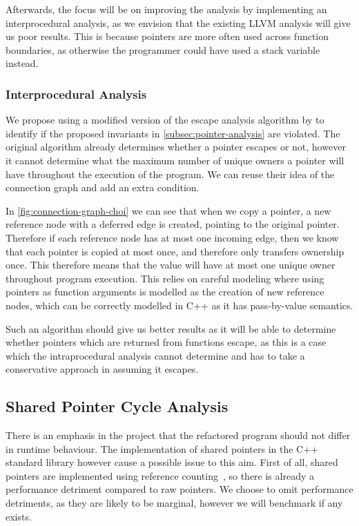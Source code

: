 \documentclass{proposal}
\begin{document}
    Afterwards, the focus will be on improving the analysis by implementing an interprocedural analysis, as we envision that the existing LLVM analysis will give us poor results.
    This is because pointers are more often used across function boundaries, as otherwise the programmer could have used a stack variable instead.

    \subsubsection{Interprocedural Analysis}\label{subsubsec:interprocedural-analysis}

    We propose using a modified version of the escape analysis algorithm by \citet{Choi1999} to identify if the proposed invariants in \autoref{subsec:pointer-analysis} are violated.
    The original algorithm already determines whether a pointer escapes or not, however it cannot determine what the maximum number of unique owners a pointer will have throughout the execution of the program.
    We can reuse their idea of the connection graph and add an extra condition.

    In \autoref{fig:connection-graph-choi} we can see that when we copy a pointer, a new reference node with a deferred edge is created, pointing to the original pointer.
    Therefore if each reference node has at most one incoming edge, then we know that each pointer is copied at most once, and therefore only transfers ownership once.
    This therefore means that the value will have at most one unique owner throughout program execution.
    This relies on careful modeling where using pointers as function arguments is modelled as the creation of new reference nodes, which can be correctly modelled in C++ as it has pass-by-value semantics.

    Such an algorithm should give us better results as it will be able to determine whether pointers which are returned from functions escape, as this is a case which the intraprocedural analysis cannot determine and has to take a conservative approach in assuming it escapes.

    \subsection{Shared Pointer Cycle Analysis}\label{subsec:shared-pointer-cycle-analysis}

    There is an emphasis in the project that the refactored program should not differ in runtime behaviour.
    The implementation of shared pointers in the C++ standard library however cause a possible issue to this aim.
    First of all, shared pointers are implemented using reference counting~\cite{Collins1960}, so there is already a performance detriment compared to raw pointers.
    We choose to omit performance detriments, as they are likely to be marginal, however we will benchmark if any exists.
\end{document}
